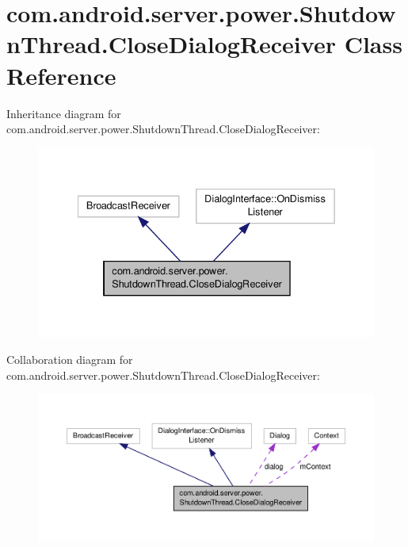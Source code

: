\hypertarget{classcom_1_1android_1_1server_1_1power_1_1ShutdownThread_1_1CloseDialogReceiver}{\section{com.\-android.\-server.\-power.\-Shutdown\-Thread.\-Close\-Dialog\-Receiver Class Reference}
\label{classcom_1_1android_1_1server_1_1power_1_1ShutdownThread_1_1CloseDialogReceiver}
}


Inheritance diagram for com.\-android.\-server.\-power.\-Shutdown\-Thread.\-Close\-Dialog\-Receiver\-:
\nopagebreak
\begin{figure}[H]
\begin{center}
\leavevmode
\includegraphics[width=334pt]{classcom_1_1android_1_1server_1_1power_1_1ShutdownThread_1_1CloseDialogReceiver__inherit__graph}
\end{center}
\end{figure}


Collaboration diagram for com.\-android.\-server.\-power.\-Shutdown\-Thread.\-Close\-Dialog\-Receiver\-:
\nopagebreak
\begin{figure}[H]
\begin{center}
\leavevmode
\includegraphics[width=350pt]{classcom_1_1android_1_1server_1_1power_1_1ShutdownThread_1_1CloseDialogReceiver__coll__graph}
\end{center}
\end{figure}
